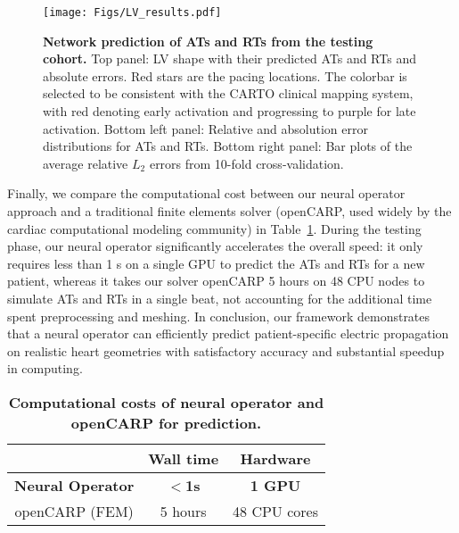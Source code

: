 \documentclass[review]{elsarticle}
\begin{document}
\begin{figure}
    \centering
	\texttt{[image: Figs/LV\_results.pdf]} 
    \caption{\textbf{Network prediction of ATs and RTs from the testing cohort.} Top panel: LV shape with their predicted ATs and RTs and absolute errors. Red stars are the pacing locations. The colorbar is selected to be consistent with the CARTO clinical mapping system, with red denoting early activation and progressing to purple for late activation.  Bottom left panel: Relative and absolution error distributions for ATs and RTs. Bottom right panel: Bar plots of the average relative $L_2$ errors from 10-fold cross-validation.}
    \label{fig:LV_results}
\end{figure}

Finally, we compare the computational cost between our neural operator approach and a traditional finite elements solver (openCARP, used widely by the cardiac computational modeling community) in Table~\ref{tab:comp_cost}. During the testing phase, our neural operator significantly accelerates the overall speed: it only requires less than 1 s on a single GPU to predict the ATs and RTs for a new patient, whereas it takes our solver openCARP 5 hours on 48 CPU nodes to simulate ATs and RTs in a single beat, not accounting for the additional time spent preprocessing and meshing. In conclusion, our framework demonstrates that a neural operator can efficiently predict patient-specific electric propagation on realistic heart geometries with satisfactory accuracy and substantial speedup in computing.

\begin{table}
    \centering
    \begin{tabular}{c  c  c}
        \hline
                    &  Wall time        & Hardware  \\
        \hline
        \textbf{Neural Operator}        &  \textbf{$<$1s}  & \textbf{1 GPU}       \\
        openCARP (FEM)   &  5 hours          & 48 CPU cores         \\
        \hline
    \end{tabular}
    \caption{\textbf{Computational costs of neural operator and openCARP for prediction.}}
    \label{tab:comp_cost}
\end{table}
\end{document}
